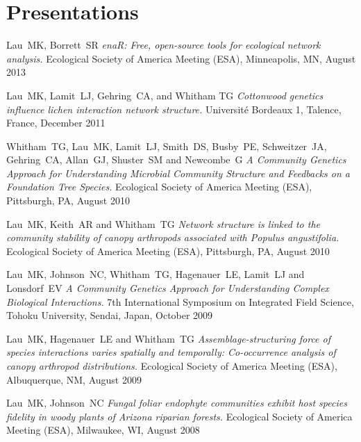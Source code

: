 \documentclass[letterpaper]{article}
\renewenvironment{itemize}{
  \begin{list}{}{
    \setlength{\leftmargin}{1em}
  }
}{
  \end{list}
}
\begin{document}
\section*{Presentations}

\begin{itemize}

\item Lau\ MK, Borrett\ SR \textit{enaR: Free, open-source tools for
  ecological network analysis.} Ecological Society of America Meeting
  (ESA), Minneapolis, MN, August 2013

\item Lau\ MK, Lamit\ LJ, Gehring\ CA, and Whitham TG
  \textit{Cottonwood genetics influence lichen interaction network
    structure.} Universit\'{e} Bordeaux 1, Talence, France, December 2011

\item Whitham\ TG, Lau\ MK, Lamit\ LJ, Smith\ DS, Busby\ PE, Schweitzer\ JA, Gehring\ CA, Allan\ GJ, Shuster\ SM and Newcombe\ G \textit{ A Community Genetics Approach for Understanding Microbial Community Structure and Feedbacks on a Foundation Tree Species.} Ecological Society of America Meeting (ESA), Pittsburgh, PA, August 2010

\item Lau\ MK, Keith\ AR and Whitham\ TG \textit{Network structure is linked to the community stability of canopy arthropods associated with Populus angustifolia.} Ecological Society of America Meeting (ESA), Pittsburgh, PA, August 2010

\item Lau\ MK, Johnson\ NC, Whitham\ TG, Hagenauer\ LE, Lamit\ LJ and Lonsdorf\ EV \textit{A Community Genetics Approach for Understanding Complex Biological Interactions.} 7th International Symposium on Integrated Field Science, Tohoku University, Sendai, Japan, October 2009

\item Lau\ MK, Hagenauer\ LE and Whitham\ TG \textit{Assemblage-structuring force of species interactions varies spatially and temporally: Co-occurrence analysis of canopy arthropod distributions.} Ecological Society of America Meeting (ESA), Albuquerque, NM, August 2009

\item Lau\ MK, Johnson\ NC \textit{Fungal foliar endophyte communities exhibit host species fidelity in woody plants of Arizona riparian forests.} Ecological Society of America Meeting (ESA), Milwaukee, WI, August 2008


\end{itemize}
\end{document}
